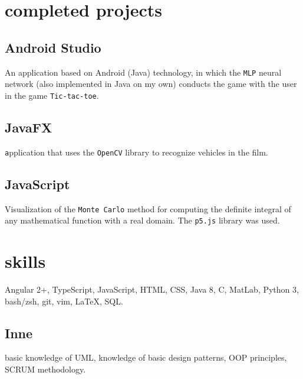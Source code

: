 \documentclass{article}
\begin{document}
\begin{minipage}[t]{.4\textwidth}

	\section{completed projects}
	\subsection{Android Studio}
    An application based on Android (Java) technology, in which the \texttt{MLP} neural network (also implemented in Java on my own) conducts the game with the user in the game \texttt{Tic-tac-toe}.

	\subsection{JavaFX}
	\texttt application that uses the \texttt{OpenCV} library to recognize vehicles in the film.

	\subsection{JavaScript}
    Visualization of the \texttt{Monte Carlo} method for computing the definite integral of any mathematical function with a real domain. The \texttt{p5.js} library was used.

	\vspace{1em}

	\section{skills}
    \vspace{1em}
	Angular 2+, TypeScript, JavaScript, HTML, CSS, Java 8, C, MatLab, Python 3, bash/zsh, git, vim, \LaTeX, SQL.

	\subsection{Inne}
	basic knowledge of UML, knowledge of basic design patterns, OOP principles, SCRUM methodology.


\end{minipage}
\end{document}
